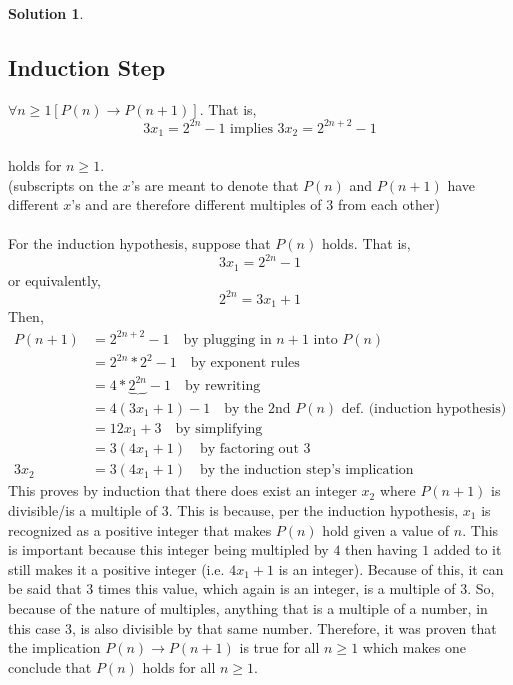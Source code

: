 \documentclass{article}
\theoremstyle{definition}
\newtheorem*{solution}{Solution}
\begin{document}
\begin{solution}
\subsection*{Induction Step}
$\forall n \geqslant 1[P(n) \rightarrow P(n+1)]$. That is,\\
$$ 3x_{1} = 2^{2n} - 1 \mbox{ implies } 3x_{2} = 2^{2n+2} - 1 $$\\
holds for $n \geqslant 1$.\\(subscripts on the $x$'s are meant to denote that $P(n)$ and $P(n+1)$ have different $x$'s and are therefore different multiples of $3$ from each other)\\\\
For the induction hypothesis, suppose that $P(n)$ holds. That is,\\
$$3x_1 = 2^{2n} - 1$$
or equivalently,
$$ 2^{2n} = 3x_1 + 1$$
Then,
\begin{align*}
P(n+1) &= 2^{2n+2} - 1 \quad \mbox{by plugging in $n+1$ into $P(n)$}\\
&= 2^{2n} * 2^2 - 1 \quad \mbox{by exponent rules}\\
&= 4 * \underbrace{2^{2n}} - 1 \quad \mbox{by rewriting}\\
&= 4 (3x_1+1) -1 \quad \mbox{by the 2nd $P(n)$ def. (induction hypothesis)}\\
&= 12x_1 + 3 \quad \mbox{by simplifying}\\
&= 3(4x_1 + 1) \quad \mbox{by factoring out 3}\\
3x_2 &= 3(4x_1 + 1) \quad \mbox{by the induction step's implication}
\end{align*}
This proves by induction that there does exist an integer $x_2$ where $P(n+1)$ is divisible/is a multiple of $3$. This is because, per the induction hypothesis, $x_1$ is recognized as a positive integer that makes $P(n)$ hold given a value of $n$. This is important because this integer being multipled by $4$ then having $1$ added to it still makes it a positive integer (i.e. $4x_1 + 1$ is an integer). Because of this, it can be said that $3$ times this value, which again is an integer, is a multiple of 3. So, because of the nature of multiples, anything that is a multiple of a number, in this case $3$, is also divisible by that same number. Therefore, it was proven that the implication $P(n) \rightarrow P(n+1)$ is true for all $n \geqslant 1$ which makes one conclude that $P(n)$ holds for all $n \geqslant 1$.
\end{solution}
\end{document}
